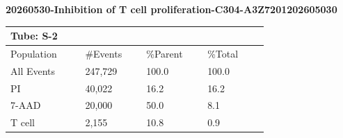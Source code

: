\documentclass[UTF8,10pt,a4paper,fontset=fandol]{ctexart}
\newcommand{\fieldvalue}[1]{#1}
\begin{document}
\textbf{20260530-Inhibition of T cell proliferation-C304-A3Z7201202605030}

\begin{center}
\begin{minipage}{0.92\linewidth}
\centering
\hfill

\vspace{0.4cm}

\hfill
\end{minipage}
\end{center}

\begin{center}
\small
\begin{tabular}{|p{0.22\linewidth}|p{0.18\linewidth}|p{0.18\linewidth}|p{0.18\linewidth}|}
\hline
\multicolumn{4}{|l|}{Tube: \textbf{S-2}}\\
\hline
Population & \#Events & \%Parent & \%Total\\
\hline
All Events &
\fieldvalue{247,729} &
\fieldvalue{100.0} &
\fieldvalue{100.0}\\
\hline
PI &
\fieldvalue{40,022} &
\fieldvalue{16.2} &
\fieldvalue{16.2}\\
\hline
7-AAD &
\fieldvalue{20,000} &
\fieldvalue{50.0} &
\fieldvalue{8.1}\\
\hline
T cell &
\fieldvalue{2,155} &
\fieldvalue{10.8} &
\fieldvalue{0.9}\\
\hline
\end{tabular}
\end{center}
\end{document}
